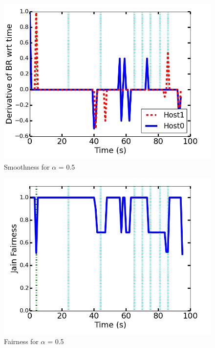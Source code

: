 \documentclass[12pt]{article}
\begin{document}
\begin{figure}
\centering
\includegraphics[scale = 0.75]{exp2/smoothness.png}
\caption{Smoothness for $\alpha$ = 0.5}
\end{figure}

\begin{figure}
\centering
\includegraphics[scale = 0.75]{exp2/fairness.png}
\caption{Fairness for $\alpha$ = 0.5}
\end{figure}
\end{document}
